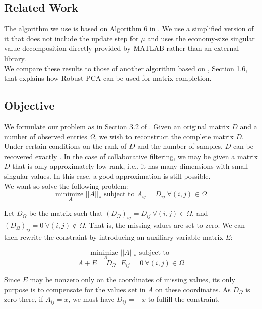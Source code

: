 \documentclass[10pt,conference,compsocconf]{IEEEtran}
\begin{document}
\subsection{Related Work}

The algorithm we use is based on Algorithm 6 in \cite{almpaper}.
We use a simplified version of it that does not include the update step
for $\mu$ and uses the economy-size singular value decomposition directly
provided by MATLAB rather than an external library. \\

We compare these results to those of another algorithm based on \cite{rpcapaper},
Section 1.6, that explains how Robust PCA can be used for matrix completion. \\

\subsection{Objective}

We formulate our problem as in Section 3.2 of \cite{almpaper}. Given an original matrix $D$ and
a number of observed entries $\Omega$, we wish to reconstruct the complete matrix $D$. Under certain
conditions on the rank of $D$ and the number of samples, $D$ can be recovered exactly \cite{exactpaper}. 
In the case of collaborative filtering, we may be given a matrix $D$ that is only
approximately low-rank, i.e., it has many dimensions with small singular values. In this case, a good approximation
is still possible. \\

We want so solve the following problem: 
$$ \underset{A}{\text{minimize }} ||A||_* \text{ subject to  } A_{ij} = D_{ij} \ \forall(i, j) \in \Omega$$

Let $D_{\Omega}$ be the matrix such that $(D_{\Omega})_{ij} = D_{ij} \ \forall(i, j) \in \Omega$, and $(D_{\Omega})_{ij} = 0 \ \forall(i, j) \notin \Omega$. That is, the missing values are set to zero. We can then rewrite the constraint by introducing an auxiliary variable matrix $E$:

$$ \underset{A}{\text{minimize }} ||A||_* \text{ subject to  }$$ 
$$A + E = D_{\Omega} \ \ \ E_{ij} = 0 \ \forall(i, j) \in \Omega$$

Since $E$ may be nonzero only on the coordinates of missing values, its only purpose is to compensate for the values set in $A$ on these coordinates. As $D_{\Omega}$ is zero there, if $A_{ij} = x$, we must have $D_{ij} = -x$ to fulfill the constraint. \\
\end{document}
